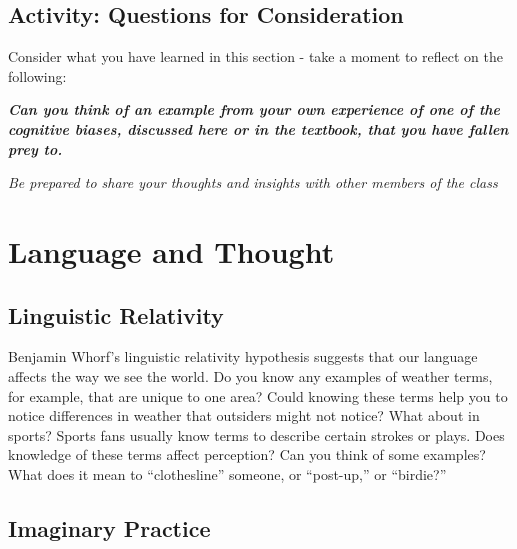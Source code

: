 \documentclass[
]{book}
\begin{document}
\hypertarget{activity-questions-for-consideration-1}{%
\subsection*{Activity: Questions for Consideration}\label{activity-questions-for-consideration-1}}

\begin{reflect}
Consider what you have learned in this section - take a moment to reflect on the following:

\textbf{\emph{Can you think of an example from your own experience of one of the cognitive biases, discussed here or in the textbook, that you have fallen prey to.}}

\emph{Be prepared to share your thoughts and insights with other members of the class}
\end{reflect}

\hypertarget{language-and-thought}{%
\section{Language and Thought}\label{language-and-thought}}

\hypertarget{linguistic-relativity}{%
\subsection*{Linguistic Relativity}\label{linguistic-relativity}}

Benjamin Whorf's linguistic relativity hypothesis suggests that our language affects the way we see the world. Do you know any examples of weather terms, for example, that are unique to one area? Could knowing these terms help you to notice differences in weather that outsiders might not notice? What about in sports? Sports fans usually know terms to de­scribe certain strokes or plays. Does knowledge of these terms affect percep­tion? Can you think of some examples? What does it mean to ``clothesline'' someone, or ``post-up,'' or ``birdie?''

\hypertarget{imaginary-practice}{%
\subsection*{Imaginary Practice}\label{imaginary-practice}}
\end{document}
